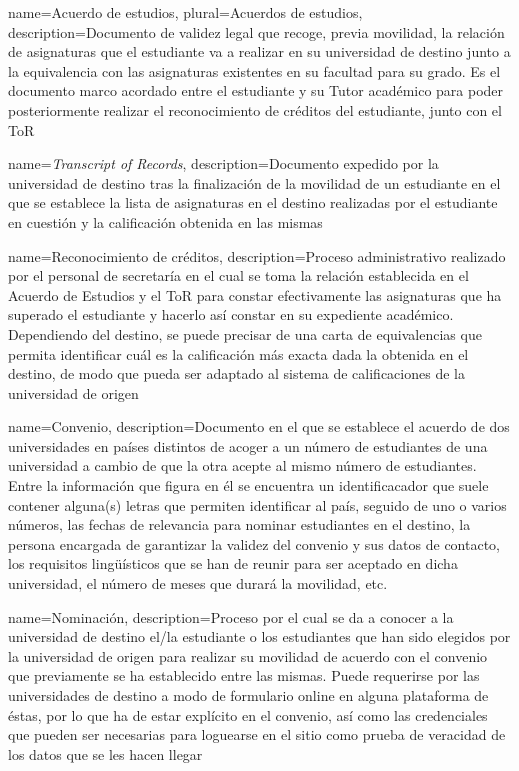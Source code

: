 \makeglossaries

{
	name=Acuerdo de estudios,
	plural=Acuerdos de estudios,
	description={Documento de validez legal que recoge, previa movilidad, la relación de asignaturas que el estudiante va a realizar en su universidad de destino junto a la equivalencia con las asignaturas existentes en su facultad para su grado. Es el documento marco acordado entre el estudiante y su \gls{Tutor} académico para poder posteriormente realizar el reconocimiento de créditos del estudiante, junto con el \gls{ToR}}
}

{
	name=\textit{Transcript of Records},
	description={Documento expedido por la universidad de destino tras la finalización de la movilidad de un estudiante en el que se establece la lista de asignaturas en el destino realizadas por el estudiante en cuestión y la calificación obtenida en las mismas}
}

{
	name=Reconocimiento de créditos,
	description={Proceso administrativo realizado por el personal de secretaría en el cual se toma la relación establecida en el Acuerdo de Estudios y el \gls{ToR} para constar efectivamente las asignaturas que ha superado el estudiante y hacerlo así constar en su expediente académico. Dependiendo del destino, se puede precisar de una carta de equivalencias que permita identificar cuál es la calificación más exacta dada la obtenida en el destino, de modo que pueda ser adaptado al sistema de calificaciones de la universidad de origen}
}

{
	name=Convenio,
	description={Documento en el que se establece el acuerdo de dos universidades en países distintos de acoger a un número de estudiantes de una universidad a cambio de que la otra acepte al mismo número de estudiantes. Entre la información que figura en él se encuentra un identificacador que suele contener alguna(s) letras que permiten identificar al país, seguido de uno o varios números, las fechas de relevancia para nominar estudiantes en el destino, la persona encargada de garantizar la validez del convenio y sus datos de contacto, los requisitos lingüísticos que se han de reunir para ser aceptado en dicha universidad, el número de meses que durará la movilidad, etc.}
}

{
	name=Nominación,
	description={Proceso por el cual se da a conocer a la universidad de destino el/la estudiante o los estudiantes que han sido elegidos por la universidad de origen para realizar su movilidad de acuerdo con el convenio que previamente se ha establecido entre las mismas. Puede requerirse por las universidades de destino a modo de formulario online en alguna plataforma de éstas, por lo que ha de estar explícito en el convenio, así como las credenciales que pueden ser necesarias para loguearse en el sitio como prueba de veracidad de los datos que se les hacen llegar}
}

